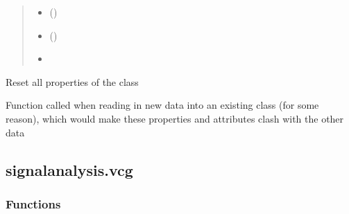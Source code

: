 \documentclass[letterpaper,10pt,english]{sphinxmanual}
\begin{document}
\begin{fulllineitems}
\begin{fulllineitems}
\begin{quote}
\begin{description}
\begin{itemize}
\item {} 
\sphinxAtStartPar
{} (\sphinxstyleliteralemphasis{\sphinxupquote{\#}}) \textendash{} 

\item {} 
\sphinxAtStartPar
{} () \textendash{} 

\item {} 
\sphinxAtStartPar
{} \textendash{} 

\end{itemize}

\end{description}\end{quote}

\end{fulllineitems}


\begin{fulllineitems}
\label{\detokenize{_autosummary/signalanalysis.general.Signal:signalanalysis.general.Signal.reset}}
\sphinxAtStartPar
Reset all properties of the class

\sphinxAtStartPar
Function called when reading in new data into an existing class (for some reason), which would make these
properties and attributes clash with the other data

\end{fulllineitems}


\end{fulllineitems}



\subsection{signalanalysis.vcg}
\label{\detokenize{_autosummary/signalanalysis.vcg:module-signalanalysis.vcg}}\label{\detokenize{_autosummary/signalanalysis.vcg:signalanalysis-vcg}}\label{\detokenize{_autosummary/signalanalysis.vcg::doc}}\subsubsection*{Functions}
\end{document}
